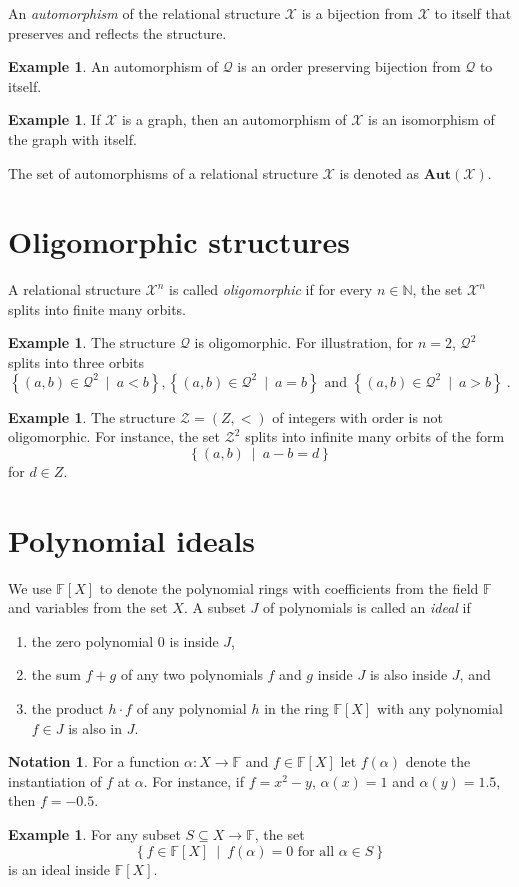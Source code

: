 \documentclass[12pt,a4paper,article]{memoir}
\newcommand{\struct}{\mathcal{X}}
\newcommand{\dloQ}{\mathcal{Q}}
\newcommand{\ordZ}{\mathcal{Z}}
\newcommand{\N}{\mathbb{N}}
\newcommand{\F}{\mathbb{F}}
\newcommand{\poly}[2]{#1[#2]}
\newcommand{\setof}[2]{\left\{#1\ \mid\ #2 \right\}}
\newcommand{\emphdef}[1]{\emph{\textcolor{BrickRed}{#1}}}
\theoremstyle{definition}
\newtheorem{example}[theorem]{Example}
\newtheorem{notation}[theorem]{Notation}
\begin{document}
An \emphdef{automorphism} of the relational structure $\struct$ is a bijection from $\struct$ to itself that preserves and reflects the structure.
%
\begin{example}
An automorphism of $\dloQ$ is an order preserving bijection from $\mathcal{Q}$ to itself.
\end{example}
%
\begin{example}
If $\struct$ is a graph,
then an automorphism of $\struct$ is an isomorphism of the graph with itself.
\end{example}
%
The set of automorphisms of a relational structure $\struct$ is denoted as \emphdef{$\mathbf{Aut}(\struct)$}.
%
\section{Oligomorphic structures}
%
A relational structure $\struct^n$ is called \emphdef{oligomorphic} if for every $n\in\N$,
the set $\struct^n$ splits into finite many orbits.
%
\begin{example}
The structure $\dloQ$ is oligomorphic.
For illustration, for $n = 2$, $\dloQ^2$ splits into three orbits
\[
\setof{(a,b)\in\dloQ^2}{a < b},
\setof{(a,b)\in\dloQ^2}{a = b}
\text{ and }
\setof{(a,b)\in\dloQ^2}{a > b} \ .
\]
\end{example}
%
\begin{example}
The structure $\ordZ = (Z,<)$ of integers with order is not oligomorphic.
For instance,
the set $\ordZ^2$ splits into infinite many orbits of the form
\[
\setof{(a,b)}{a - b = d}
\]
for $d\in Z$.
\end{example}
%
\section{Polynomial ideals}
%
We use $\poly{\F}{X}$ to denote the polynomial rings with coefficients from the field $\F$ and variables from the set $X$.
A subset $J$ of polynomials is called an \emphdef{ideal} if
\begin{enumerate}
\item the zero polynomial $0$ is inside $J$,
\item the sum $f + g$ of any two polynomials $f$ and $g$ inside $J$ is also inside $J$, and
\item the product $h\cdot f$ of any polynomial $h$ in the ring $\poly{\F}{X}$ with any polynomial $f\in J$ is also in $J$.
\end{enumerate}
%
\begin{notation}
For a function $\alpha : X\to \F$ and $f\in\poly{\F}{X}$ let $f(\alpha)$ denote the instantiation of $f$ at $\alpha$.
For instance, if $f = x^2 - y$, $\alpha(x) = 1$ and $\alpha(y) = 1.5$,
then $f = -0.5$.
\end{notation}
%
\begin{example}
For any subset $S\subseteq X\to \F$,
the set
\[
\setof{f\in\poly{\F}{X}}{f(\alpha) = 0\text{ for all }\alpha\in S}
\]
is an ideal inside $\poly{\F}{X}$.
\end{example}
%
\end{document}
